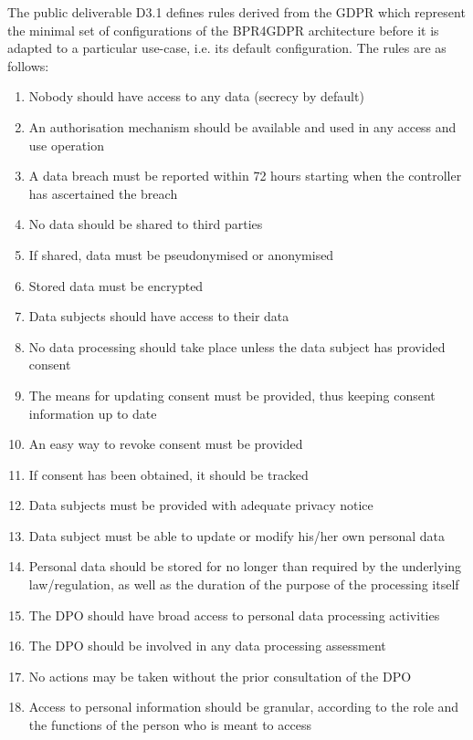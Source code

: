The public deliverable D3.1 \cite{lioudakis_d3.1_2019} defines rules derived from the GDPR which represent the minimal set of configurations of the BPR4GDPR architecture before it is adapted to a particular use-case, i.e. its default configuration. The rules are as follows:
\begin{enumerate}[label={\textit{Rule\#\theenumi}}]
    \item  Nobody should have access to any data (secrecy by default)
    \item  An authorisation mechanism should be available and used in any access and use operation
    \item  A data breach must be reported within 72 hours starting when the controller has ascertained the
    breach
    \item  No data should be shared to third parties
    \item  If shared, data must be pseudonymised or anonymised
    \item  Stored data must be encrypted
    \item  Data subjects should have access to their data
    \item  No data processing should take place unless the data subject has provided consent
    \item  The means for updating consent must be provided, thus keeping consent information up to date
    \item  An easy way to revoke consent must be provided
    \item  If consent has been obtained, it should be tracked
    \item  Data subjects must be provided with adequate privacy notice
    \item  Data subject must be able to update or modify his/her own personal data
    \item  Personal data should be stored for no longer than required by the underlying law/regulation, as
    well as the duration of the purpose of the processing itself
    \item  The DPO should have broad access to personal data processing activities
    \item  The DPO should be involved in any data processing assessment
    \item  No actions may be taken without the prior consultation of the DPO
    \item  Access to personal information should be granular, according to the role and the functions of the
    person who is meant to access

\end{enumerate}
